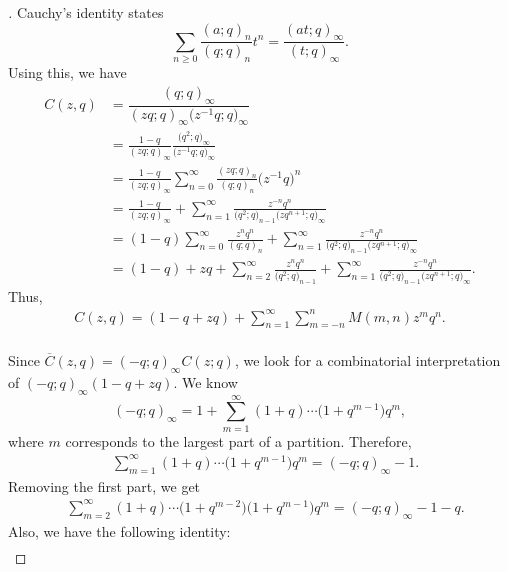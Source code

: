 \documentclass[10pt,a4paper]{amsart}
\numberwithin{equation}{section}
\newcommand\mylabel[1]{\label{#1}}
\begin{document}
\begin{proof}[\unskip\nopunct]
Cauchy's identity \cite[p.\ 17]{An98} states
\begin{equation*}%
\sum\limits_{n\geq 0}\frac{(a;q)_n}{(q;q)_{n}}t^n=\frac{(at;q)_{\infty}}{(t;q)_{\infty}}.
\end{equation*}
Using this, we have
\begin{align*}
C(z,q) &{}=\dfrac{(q;q)_{\infty}}{(zq;q)_{\infty}\bigl(z^{-1}q;q\bigr)_{\infty}}
\\
&{}=\frac{1-q}{(zq;q)_{\infty}}\frac{\bigl(q^2;q\bigr)_{\infty}}{\bigl(z^{-1}q;q\bigr)_{\infty}}
\\
&{}=\frac{1-q}{(zq;q)_{\infty}}\sum\limits_{n=0}^{\infty}\frac{(zq;q)_n}{(q;q)_n}\bigl(z^{-1}q\bigr)^n
\\
&{}=\frac{1-q}{(zq;q)_{\infty}}+\sum\limits_{n=1}^{\infty}\frac{z^{-n}q^n}{\bigl(q^2;q\bigr)_{n-1}\bigl(zq^{n+1};q\bigr)_{\infty}}
\\
&{}=(1-q)\sum\limits_{n=0}^{\infty}\frac{z^{n}q^n}{(q;q)_{n}}+\sum\limits_{n=1}^{\infty}\frac{z^{-n}q^n}{\bigl(q^2;q\bigr)_{n-1}\bigl(zq^{n+1};q\bigr)_{\infty}}
\\
&{}=(1-q)+zq+\sum\limits_{n=2}^{\infty}\frac{z^{n}q^n}{\bigl(q^2;q\bigr)_{n-1}}+\sum\limits_{n=1}^{\infty}\frac{z^{-n}q^n}{\bigl(q^2;q\bigr)_{n-1}\bigl(zq^{n+1};q\bigr)_{\infty}}.
\end{align*}
Thus,
\begin{align}
\mylabel{eq:crankexp}
C(z,q)=(1-q+zq)+\sum_{n=1}^\infty \sum_{m=-n}^n M(m,n) z^m q^n.
\end{align}
\\
Since $\overline{C}(z,q)=(-q;q)_{\infty}C(z;q)$, we look for a combinatorial interpretation of $(-q;q)_{\infty}(1-q+zq)$. We know
\begin{equation*}%
(-q;q)_{\infty}=1+\sum\limits_{m=1}^{\infty}(1+q)\cdots\bigl(1+q^{m-1}\bigr)q^m,
\end{equation*}
where $m$ corresponds to the largest part of a partition. Therefore,
\begin{align}
\mylabel{eq:distexp}
&\sum\limits_{m=1}^{\infty}(1+q)\cdots\bigl(1+q^{m-1}\bigr)q^m=(-q;q)_{\infty}-1.
\end{align}
Removing the first part, we get
\begin{align}
\mylabel{eq:RFP1}
&\sum\limits_{m=2}^{\infty}(1+q)\cdots\bigl(1+q^{m-2}\bigr)\bigl(1+q^{m-1}\bigr)q^m=(-q;q)_{\infty}-1-q.
\end{align}
Also, we have the following identity:
\begin{align}

\end{align}
\end{proof}
\end{document}
